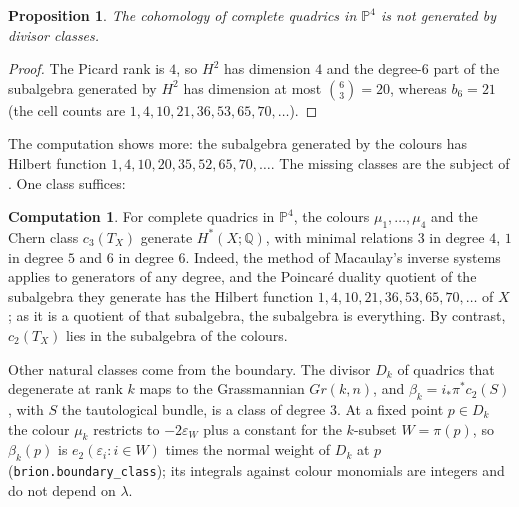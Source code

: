 \documentclass[11pt]{amsart}
\newtheorem{proposition}[theorem]{Proposition}
\theoremstyle{definition}
\newtheorem{computation}[theorem]{Computation}
\theoremstyle{remark}
\newcommand{\code}[1]{\texttt{#1}}
\newcommand{\PP}{\mathbb{P}}
\newcommand{\QQ}{\mathbb{Q}}
\begin{document}
\begin{proposition}\label{prop:notgenerated}
The cohomology of complete quadrics in $\PP^4$ is not generated by divisor
classes.
\end{proposition}
\begin{proof}
The Picard rank is $4$, so $H^2$ has dimension $4$ and the degree-$6$ part of
the subalgebra generated by $H^2$ has dimension at most $\binom{6}{3}=20$,
whereas $b_6=21$ (the cell counts are $1,4,10,21,36,53,65,70,\dots$).
\end{proof}
The computation shows more: the subalgebra generated by the colours has
Hilbert function $1,4,10,20,35,52,65,70,\dots$. The missing classes are the
subject of \cite{DGMP}. One class suffices:

\begin{computation}\label{comp:generators}
For complete quadrics in $\PP^4$, the colours $\mu_1,\dots,\mu_4$ and the
Chern class $c_3(T_X)$ generate $H^*(X;\QQ)$, with minimal relations $3$ in
degree $4$, $1$ in degree $5$ and $6$ in degree $6$. Indeed, the method of
Macaulay's inverse systems applies to generators of any degree, and the
Poincar\'e duality quotient of the subalgebra they generate has the Hilbert
function $1,4,10,21,36,53,65,70,\dots$ of $X$; as it is a quotient of that
subalgebra, the subalgebra is everything. By contrast, $c_2(T_X)$ lies in the
subalgebra of the colours.
\end{computation}

Other natural classes come from the boundary. The divisor $D_k$ of quadrics
that degenerate at rank $k$ maps to the Grassmannian $Gr(k,n)$, and
$\beta_k=i_*\pi^*c_2(S)$, with $S$ the tautological bundle, is a class of degree
$3$. At a fixed point $p\in D_k$ the colour $\mu_k$ restricts to
$-2\varepsilon_W$ plus a constant for the $k$-subset $W=\pi(p)$, so $\beta_k(p)$ is
$e_2(\varepsilon_i:i\in W)$ times the normal weight of $D_k$ at $p$
(\code{brion.boundary\_class}); its integrals against colour monomials are
integers and do not depend on $\lambda$.
\end{document}
